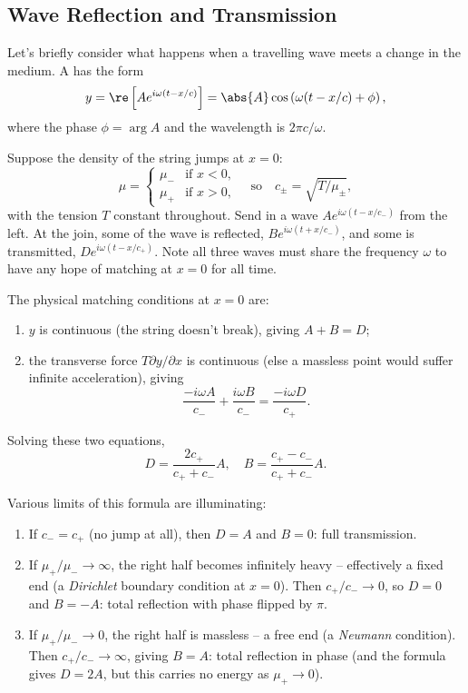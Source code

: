 \subsection{Wave Reflection and Transmission}

Let's briefly consider what happens when a travelling wave meets a change in the medium. A  has the form
$$
y = \re\left[A e^{i \omega (t - x/c)}\right] = \abs{A} \cos\left(\omega(t - x/c) + \phi\right),
$$
where the phase $\phi = \arg A$ and the wavelength is $2 \pi c / \omega$.

Suppose the density of the string jumps at $x = 0$:
$$
\mu = \begin{cases}
    \mu_- &\mbox{if } x < 0, \\
    \mu_+ &\mbox{if } x > 0,
\end{cases}
\quad \text{so} \quad
c_\pm = \sqrt{T / \mu_\pm},
$$
with the tension $T$ constant throughout. Send in a wave $A e^{i \omega (t - x/c_-)}$ from the left. At the join, some of the wave is reflected, $B e^{i \omega (t + x /c_-)}$, and some is transmitted, $D e^{i \omega (t - x/c_+)}$. Note all three waves must share the frequency $\omega$ to have any hope of matching at $x = 0$ for all time.

The physical matching conditions at $x = 0$ are:
\begin{enumerate}[label=(\roman*)]
    \item $y$ is continuous (the string doesn't break), giving $A + B = D$;
    \item the transverse force $T \partial y/\partial x$ is continuous (else a massless point would suffer infinite acceleration), giving
    $$
    \frac{-i \omega A}{c_-} + \frac{i \omega B}{c_-} = \frac{-i \omega D}{c_+}.
    $$
\end{enumerate}
Solving these two equations,
$$
D = \frac{2 c_+}{c_+ + c_-} A, \quad B = \frac{c_+ - c_-}{c_+ + c_-} A.
$$

Various limits of this formula are illuminating:
\begin{enumerate}[label=(\roman*)]
    \item If $c_- = c_+$ (no jump at all), then $D = A$ and $B = 0$: full transmission.
    \item If $\mu_+/\mu_- \rightarrow \infty$, the right half becomes infinitely heavy -- effectively a fixed end (a \emph{Dirichlet} boundary condition at $x = 0$). Then $c_+/c_- \rightarrow 0$, so $D = 0$ and $B = -A$: total reflection with phase flipped by $\pi$.
    \item If $\mu_+ / \mu_- \rightarrow 0$, the right half is massless -- a free end (a \emph{Neumann} condition). Then $c_+ / c_- \rightarrow \infty$, giving $B = A$: total reflection in phase (and the formula gives $D = 2A$, but this carries no energy as $\mu_+ \to 0$).
\end{enumerate}

